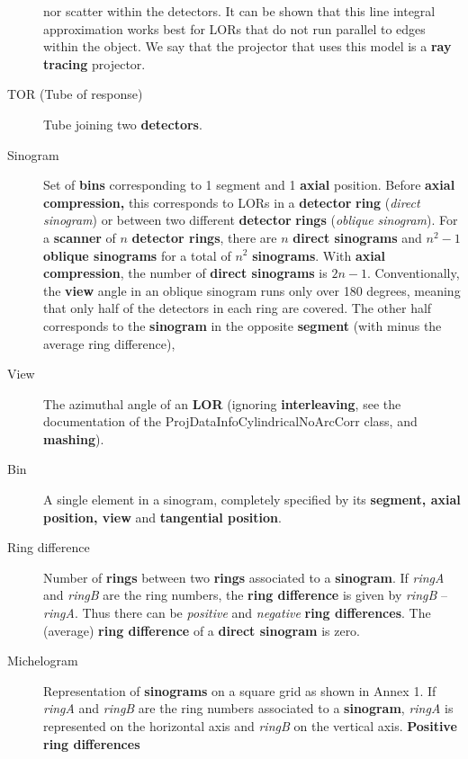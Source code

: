 \documentclass{article}
\begin{document}
\begin{description}
nor scatter within the detectors. It can be shown that this line 
integral approximation works best for LORs that do not run parallel 
to edges within the object. We say that the projector that uses 
this model is a \textbf{ray tracing} projector.
\item[TOR (Tube of response)] 
Tube joining two \textbf{detectors}. 
\item[Sinogram] 
Set of \textbf{bins} corresponding to 1 segment and 1 \textbf{axial} position. 
Before \textbf{axial compression,} this corresponds to LORs in a \textbf{detector} \textbf{ring} 
(\textit{direct} \textit{sinogram}) or between two different \textbf{detector} \textbf{rings} 
(\textit{oblique} \textit{sinogram}). For a \textbf{scanner} of $n$ \textbf{detector 
rings}, there are $n$ \textbf{direct sinograms} and $n^2-1$ \textbf{oblique 
sinograms} for a total of $n^2$ \textbf{sinograms}. With \textbf{axial 
compression}, the number of \textbf{direct sinograms} is $2n-1$. Conventionally, 
the \textbf{view} angle in an oblique sinogram runs only over 180 
degrees, meaning that only half of the detectors in each ring 
are covered. The other half corresponds to the \textbf{sinogram} in 
the opposite \textbf{segment} (with minus the average ring difference),
\item[View] 
The azimuthal angle of an \textbf{LOR} (ignoring \textbf{interleaving}, 
see the documentation of the ProjDataInfoCylindricalNoArcCorr 
class, and \textbf{mashing}).
\item[Bin] 
A single element in a sinogram, completely specified by its \textbf{segment, 
axial} \textbf{position, view} and \textbf{tangential position}.
\item[Ring difference] 
Number of \textbf{rings} between two \textbf{rings} associated to a \textbf{sinogram}. 
If \textit{ringA} and \textit{ringB} are the ring numbers, the \textbf{ring 
difference} is given by \textit{ringB} -- \textit{ringA}. Thus there can be \textit{positive} 
and \textit{negative} \textbf{ring differences}. \linebreak
The (average) \textbf{ring difference} of a \textbf{direct sinogram} is 
zero.
\item[Michelogram] 
Representation of \textbf{sinograms} on a square grid as shown in 
Annex 1. If \textit{ringA} and \textit{ringB} are the ring numbers associated 
to a \textbf{sinogram}, \textit{ringA} is represented on the horizontal 
axis and \textit{ringB} on the vertical axis. \textbf{Positive ring differences} 

\end{description}
\end{document}
